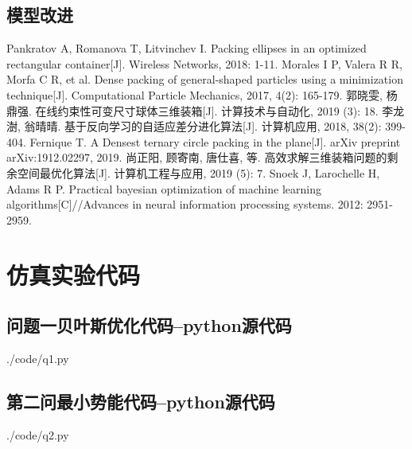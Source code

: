 \documentclass{whutmod}
\begin{document}
  		\subsection{模型改进}

  
  
 
	\newpage	%
	\nocite{*}		%
	\begin{thebibliography}{9}%
		Pankratov A, Romanova T, Litvinchev I. Packing ellipses in an optimized rectangular container[J]. Wireless Networks, 2018: 1-11.
		Morales I P, Valera R R, Morfa C R, et al. Dense packing of general-shaped particles using a minimization technique[J]. Computational Particle Mechanics, 2017, 4(2): 165-179.
		郭晓雯, 杨鼎强. 在线约束性可变尺寸球体三维装箱[J]. 计算技术与自动化, 2019 (3): 18.
		李龙澍, 翁晴晴. 基于反向学习的自适应差分进化算法[J]. 计算机应用, 2018, 38(2): 399-404.
		Fernique T. A Densest ternary circle packing in the plane[J]. arXiv preprint arXiv:1912.02297, 2019.
		尚正阳, 顾寄南, 唐仕喜, 等. 高效求解三维装箱问题的剩余空间最优化算法[J]. 计算机工程与应用, 2019 (5): 7.
		Snoek J, Larochelle H, Adams R P. Practical bayesian optimization of machine learning algorithms[C]//Advances in neural information processing systems. 2012: 2951-2959.
	\end{thebibliography}

	\newpage
	\appendix %
	\section{仿真实验代码}
		\subsection*{问题一贝叶斯优化代码--python源代码}
		 {./code/q1.py}

			
		\subsection*{第二问最小势能代码--python源代码}
		 {./code/q2.py}
	
\end{document}
